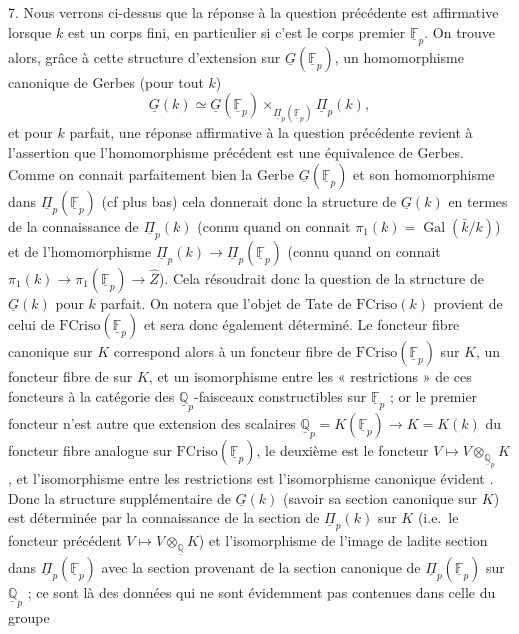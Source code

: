 \documentclass[11pt,a4paper]{article}
\begin{document}
7. \quad Nous verrons ci-dessus que la réponse à la question précédente est
affirmative lorsque $k$ est un corps fini, en particulier si c'est le corps
premier $\underline{\mathbb{F}}_{p}$. On trouve alors, grâce à cette
structure d'extension sur $\underline{G}(\underline{\mathbb{F}}_{p})$, un
homomorphisme canonique de Gerbes (pour tout $k$)
\[
\underline{G}(k) \simeq \underline{G}(\underline{\mathbb{F}}_{p})
\times_{\underline{\Pi}_{p}(\underline{\mathbb{F}}_{p})}
\underline{\Pi}_{p}(k) ,
\]
et pour $k$ parfait, une réponse affirmative à la question précédente revient
à l'assertion que l'homomorphisme précédent est une équivalence de Gerbes.
Comme on connait parfaitement bien la Gerbe
$\underline{G}(\underline{\mathbb{F}}_{p})$ et son homomorphisme dans
$\underline{\Pi}_{p}(\underline{\mathbb{F}}_{p})$ (cf plus bas) cela
donnerait donc la structure de $\underline{G}(k)$ en termes de la
connaissance de \struck{\ill{}} $\underline{\Pi}_{p}(k)$ (connu quand on
connait $\pi_{1}(k) = \operatorname{Gal}(\bar{k}/k)$) et de l'homomorphisme
$\underline{\Pi}_{p}(k) \to \underline{\Pi}_{p}(\underline{\mathbb{F}}_{p})$
(connu quand on connait
$\pi_{1}(k) \to \pi_{1}(\underline{\mathbb{F}}_{p}) \to \hat{Z}$). Cela
résoudrait donc la question de la structure de $\underline{G}(k)$ pour $k$
parfait. On notera que l'objet de Tate de $\mathrm{FCriso}(k)$ provient de
celui de $\mathrm{FCriso}(\underline{\mathbb{F}}_{p})$ et sera donc également
déterminé. Le foncteur fibre canonique sur $K$  correspond
alors à un foncteur fibre de
$\mathrm{FCriso}(\underline{\mathbb{F}}_{p})$ sur $K$, un foncteur fibre de
\struck{\ill{}}  sur $K$, et un isomorphisme entre les « restrictions » de
ces foncteurs à la catégorie des $\underline{\mathbb{Q}}_{p}$-faisceaux
constructibles sur $\underline{\mathbb{F}}_{p}$ ; or le premier foncteur
n'est autre que  extension des scalaires
$\underline{\mathbb{Q}}_{p} = K(\underline{\mathbb{F}}_{p}) \to K = K(k)$ du
foncteur fibre analogue sur $\mathrm{FCriso}(\underline{\mathbb{F}}_{p})$, le
deuxième est le foncteur
$V \mapsto V \otimes_{\underline{\mathbb{Q}}_{p}} K$, et l'isomorphisme
\struck{\ill{}} entre les restrictions est l'isomorphisme canonique évident
. Donc la
structure supplémentaire de $\underline{G}(k)$ (savoir sa section
 canonique sur $K$) est déterminée par la connaissance de la
section de $\underline{\Pi}_{p}(k)$ sur $K$ (i.e.\ le foncteur précédent
$V \mapsto V \otimes_{\underline{\mathbb{Q}}} K$) et l'isomorphisme de
l'image de ladite section dans
$\underline{\Pi}_{p}(\underline{\mathbb{F}}_{p})$ avec la section provenant
de \struck{\ill{}} la section canonique de
$\underline{\Pi}_{p}(\underline{\mathbb{F}}_{p})$ sur
$\underline{\mathbb{Q}}_{p}$ ; ce sont là des données qui ne sont évidemment
pas contenues dans celle du groupe
\end{document}
